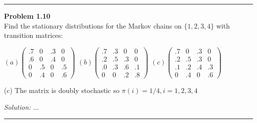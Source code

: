 \documentclass[a4paper, 11pt]{article}
\newenvironment{problem}[2][Problem]
    { \begin{mdframed}[backgroundcolor=gray!20] \textbf{#1 #2} \\}
    {  \end{mdframed}}
\newenvironment{solution}
    {\textit{Solution:}}
    {}
\begin{document}
\noindent\rule{7in}{2.8pt}
\begin{problem}{1.10}
	Find the stationary distributions for the Markov chains on $\{1,2,3,4\}$ with transition matrices:
	
	$(a)\left(\begin{array}{cccc}.7 & 0 & .3 & 0 \\ .6 & 0 & .4 & 0 \\ 0 & .5 & 0 & .5 \\ 0 & .4 & 0 & .6\end{array}\right)$
	$(b)\left(\begin{array}{cccc}.7 & .3 & 0 & 0 \\ .2 & .5 & .3 & 0 \\ .0 & .3 & .6 & .1 \\ 0 & 0 & .2 & .8\end{array}\right)$
	$(c)\left(\begin{array}{cccc}.7 & 0 & .3 & 0 \\ .2 & .5 & .3 & 0 \\ .1 & .2 & .4 & .3 \\ 0 & .4 & 0 & .6\end{array}\right)$
	
	(c) The matrix is doubly stochastic so $\pi(i)=1 / 4, i=1,2,3,4$
\end{problem}
\begin{solution}
	...
\end{solution}

\noindent\rule{7in}{2.8pt}
\end{document}
